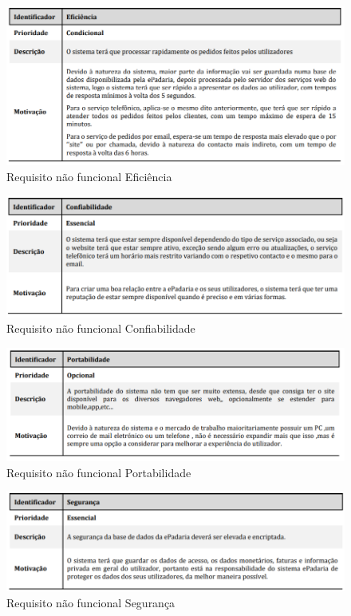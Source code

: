 \begin{figure}[H]
	\centering
	\includegraphics[width=15cm]{requisito_nao_funcional2}
	\caption{Requisito não funcional Eficiência}
	\label{fig:requisitonaofuncional2}
\end{figure}

\begin{figure}[H]
	\centering
	\includegraphics[width=15cm]{requisito_nao_funcional3}
	\caption{Requisito não funcional Confiabilidade}
	\label{fig:requisitonaofuncional3}
\end{figure}

\begin{figure}[H]
	\centering
	\includegraphics[width=15cm]{requisito_nao_funcional4}
	\caption{Requisito não funcional Portabilidade}
	\label{fig:requisitonaofuncional4}
\end{figure}

\begin{figure}[H]
	\centering
	\includegraphics[width=15cm]{requisito_nao_funcional5}
	\caption{Requisito não funcional Segurança}
	\label{fig:requisitonaofuncional5}
\end{figure}

